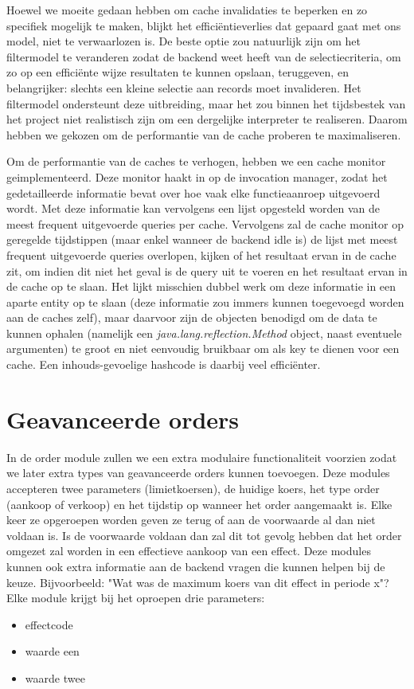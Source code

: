 Hoewel we moeite gedaan hebben om cache invalidaties te beperken en zo specifiek mogelijk te maken, blijkt het effici\"entieverlies dat gepaard gaat met ons model, niet te verwaarlozen is. De beste optie zou natuurlijk zijn om het filtermodel te veranderen zodat de backend weet heeft van de selectiecriteria, om zo op een effici\"ente wijze resultaten te kunnen opslaan, teruggeven, en belangrijker: slechts een kleine selectie aan records moet invalideren. Het filtermodel ondersteunt deze uitbreiding, maar het zou binnen het tijdsbestek van het project niet realistisch zijn om een dergelijke interpreter te realiseren. Daarom hebben we gekozen om de performantie van de cache proberen te maximaliseren.

Om de performantie van de caches te verhogen, hebben we een cache monitor geimplementeerd. Deze monitor haakt in op de invocation manager, zodat het gedetailleerde informatie bevat over hoe vaak elke functieaanroep uitgevoerd wordt. Met deze informatie kan vervolgens een lijst opgesteld worden van de meest frequent uitgevoerde queries per cache. Vervolgens zal de cache monitor op geregelde tijdstippen (maar enkel wanneer de backend idle is) de lijst met meest frequent uitgevoerde queries overlopen, kijken of het resultaat ervan in de cache zit, om indien dit niet het geval is de query uit te voeren en het resultaat ervan in de cache op te slaan.
Het lijkt misschien dubbel werk om deze informatie in een aparte entity op te slaan (deze informatie zou immers kunnen toegevoegd worden aan de caches zelf), maar daarvoor zijn de objecten benodigd om de data te kunnen ophalen (namelijk een \emph{java.lang.reflection.Method} object, naast eventuele argumenten) te groot en niet eenvoudig bruikbaar om als key te dienen voor een cache. Een inhouds-gevoelige hashcode is daarbij veel effici\"enter.

%
%

\chapter{Geavanceerde orders}

In de order module zullen we een extra modulaire functionaliteit voorzien zodat we later extra types van geavanceerde orders kunnen toevoegen.
Deze modules accepteren twee parameters (limietkoersen), de huidige koers, het type order (aankoop of verkoop) en het tijdstip op wanneer het order aangemaakt is. Elke keer ze opgeroepen worden geven ze terug of aan de voorwaarde al dan niet voldaan is. Is de voorwaarde voldaan dan zal dit tot gevolg hebben dat het order omgezet zal worden in een effectieve aankoop van een effect.
Deze modules kunnen ook extra informatie aan de backend vragen die kunnen helpen bij de keuze. Bijvoorbeeld: "Wat was de maximum koers van dit effect in periode x"?
Elke module krijgt bij het oproepen drie parameters:
\begin{itemize}
\item{effectcode}
\item{waarde een}
\item{waarde twee}
\end{itemize}

